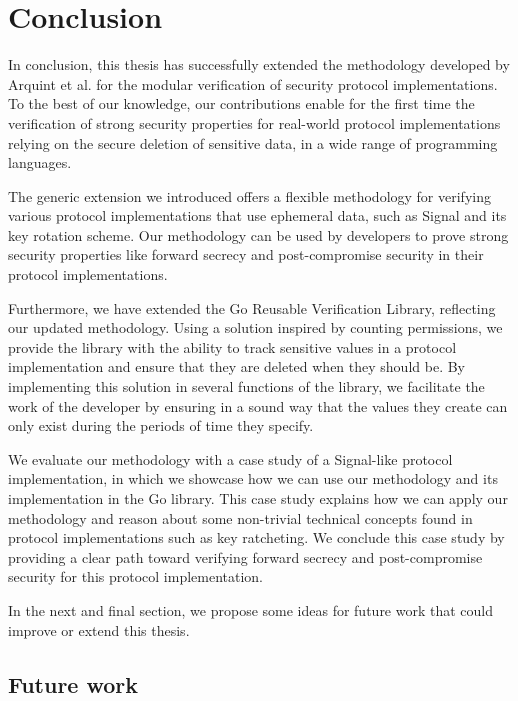 \chapter{Conclusion}
\label{chap:conclusion}

In conclusion, this thesis has successfully extended the methodology developed by Arquint et al. for the modular verification of security protocol implementations.
To the best of our knowledge, our contributions enable for the first time the verification of strong security properties for real-world protocol implementations relying on the secure deletion of sensitive data, in a wide range of programming languages.

The generic extension we introduced offers a flexible methodology for verifying various protocol implementations that use ephemeral data, such as Signal and its key rotation scheme. Our methodology can be used by developers to prove strong security properties like forward secrecy and post-compromise security in their protocol implementations.

Furthermore, we have extended the Go Reusable Verification Library, reflecting our updated methodology.
Using a solution inspired by counting permissions, we provide the library with the ability to track sensitive values in a protocol implementation and ensure that they are deleted when they should be.
By implementing this solution in several functions of the library, we facilitate the work of the developer by ensuring in a sound way that the values they create can only exist during the periods of time they specify.

We evaluate our methodology with a case study of a Signal-like protocol implementation, in which we showcase how we can use our methodology and its implementation in the Go library.
This case study explains how we can apply our methodology and reason about some non-trivial technical concepts found in protocol implementations such as key ratcheting.
We conclude this case study by providing a clear path toward verifying forward secrecy and post-compromise security for this protocol implementation.

In the next and final section, we propose some ideas for future work that could improve or extend this thesis.

\section{Future work}
\label{sec:future-work}

